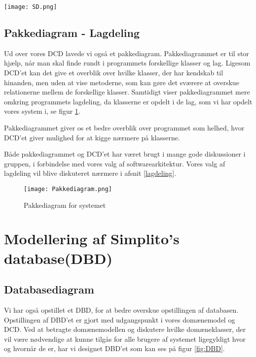 \begin{sidewaysfigure}
    \caption{SD for SOC Operation - createAppointment}
    \centering
        \texttt{[image: SD.png]}
    \label{fig:SD}
\end{sidewaysfigure}

\subsection{Pakkediagram - Lagdeling}
\label{Pakkediagram}

Ud over vores DCD lavede vi også et pakkediagram.
Pakkediagrammet er til stor hjælp, når man skal finde rundt i programmets forskellige klasser og lag.
Ligesom DCD'et kan det give et overblik over hvilke klasser, der har kendskab til hinanden, men uden at vise metoderne, som kan gøre det sværere at overskue relationerne mellem de forskellige klasser.
Samtidigt viser pakkediagrammet mere omkring programmets lagdeling, da klasserne er opdelt i de lag, som vi har opdelt vores system i, se figur \ref{fig:pakkediagram}.

Pakkediagrammet giver os et bedre overblik over programmet som helhed, hvor DCD'et giver mulighed for at kigge nærmere på klasserne.

Både pakkediagrammet og DCD'et har været brugt i mange gode diskussioner i gruppen, i forbindelse med vores valg af softwarearkitektur.
Vores valg af lagdeling vil blive diskuteret nærmere i afsnit \ref{lagdeling}.

\begin{figure}[H]
    \caption{Pakkediagram for systemet}
    \centering
        \texttt{[image: Pakkediagram.png]}
    \label{fig:pakkediagram}
\end{figure}

\section{Modellering af Simplito's database(DBD)}
\subsection{Databasediagram}
\label{DBD}

Vi har også opstillet et DBD, for at bedre overskue opstillingen af databasen.
Opstillingen af DBD'et er gjort med udgangspunkt i vores domænemodel og DCD.
Ved at betragte domænemodellen og diskutere hvilke domæneklasser, der vil være nødvendige at kunne tilgås for alle brugere af systemet ligegyldigt hvor og hvornår de er, har vi designet DBD'et som kan ses på figur \ref{fig:DBD}.

